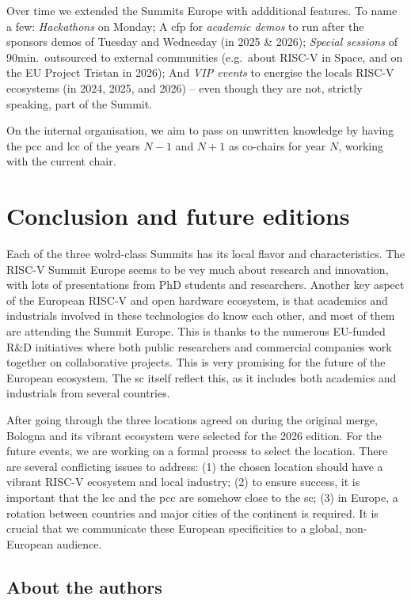 \documentclass[
	a4paper, %
	10pt, %
	unnumberedsections, %
	twoside, %
]{LTJournalArticle}
\begin{document}
Over time we extended the Summits Europe with addditional features. To
name a few: \emph{Hackathons} on Monday; A \gls{cfp} for
\emph{academic demos} to run after the sponsors demos of Tuesday and
Wednesday (in 2025 \& 2026); \emph{Special sessions} of
90\;min.\ outsourced to external communities (e.g.\ about RISC-V in
Space, and on the EU Project Tristan in 2026); And \emph{VIP events}
to energise the locals RISC-V ecosystems (in 2024, 2025, and 2026) --
even though they are not, strictly speaking, part of the Summit.

On
the internal organisation, we aim to pass on unwritten knowledge
by having the \gls{pcc} and \gls{lcc} of the years $N-1$ and $N+1$ as
co-chairs for year $N$, working with the current chair.

\section{Conclusion and future editions}

Each of the three wolrd-class Summits has its local flavor and
characteristics. The RISC-V Summit Europe seems to be vey much about
research and innovation, with lots of presentations from PhD students
and researchers. Another key aspect of the European RISC-V and open
hardware ecosystem, is that academics and industrials involved in
these technologies do know each other, and most of them are attending
the Summit Europe. This is thanks to the numerous EU-funded R\&D
initiatives where both public researchers and commercial companies
work together on collaborative projects. This is very promising for
the future of the European ecosystem. The \gls{sc} itself reflect
this, as it includes both academics and industrials from several
countries.

After going through the three locations agreed on during the original
merge, Bologna and its vibrant ecosystem were selected for the 2026
edition. For the future events, we are working on a formal process to
select the location. There are several conflicting issues to address:
(1) the chosen location should have a vibrant RISC-V ecosystem and
local industry; (2) to ensure success, it is important that the
\gls{lcc} and the \gls{pcc} are somehow close to the \gls{sc}; (3) in
Europe, a rotation between countries and major cities of the continent
is required.
It is crucial that we communicate these European specificities to a global, non-European audience.

\subsection{About the authors}
\glsresetall
\end{document}
